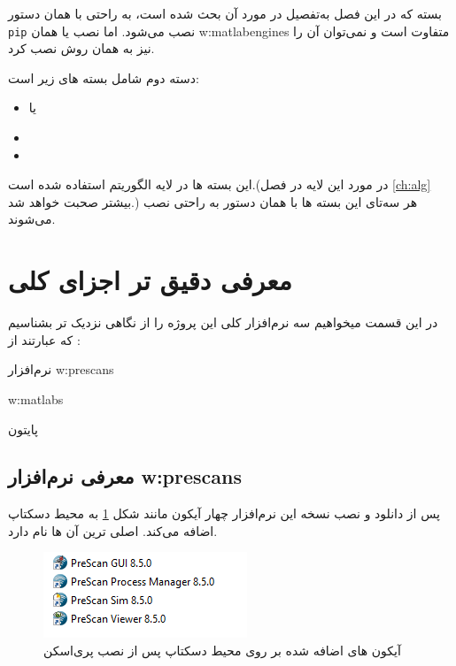 بسته  که در این فصل به‌تفصیل در مورد آن بحث شده است، به راحتی با همان دستور \texttt{pip} نصب می‌شود. اما نصب 
یا همان
\glspl{w:matlabengine}
متفاوت است و نمی‌توان آن را نیز به همان روش نصب کرد.

دسته دوم شامل بسته های زیر است:
\begin{itemize}
	\item {} یا 
	\item {}
	\item {}
	
\end{itemize}

این بسته ها در لایه الگوریتم استفاده شده است.(در مورد این لایه در فصل 
\ref{ch:alg}
بیشتر صحبت خواهد شد.)
هر سه‌تای این بسته ها با همان دستور  به راحتی نصب می‌شوند.



\section{معرفی دقیق تر اجزای کلی}
در این قسمت میخواهیم سه نرم‌افزار کلی این پروژه را از نگاهی نزدیک تر  بشناسیم که عبارتند از :
\begin{enuminline}
	\item 
	نرم‌افزار 
	\glspl{w:prescan}
	\item 
	\glspl{w:matlab}
	\item پایتون
\end{enuminline}

\subsection{معرفی نرم‌افزار 
\glspl{w:prescan}
}

پس از دانلود و نصب نسخه  این نرم‌افزار چهار آیکون مانند شکل 
\ref{fig:prescan-icons}
به محیط دسکتاپ اضافه می‌کند.  اصلی ترین آن ها 
نام دارد.

\begin{figure}[h]
	\centering
	\includegraphics[width=0.4\linewidth]{Figures/prescan-icons}
	\caption{آیکون های اضافه شده بر روی محیط دسکتاپ پس از نصب پری‌اسکن}
	\label{fig:prescan-icons}
\end{figure}

